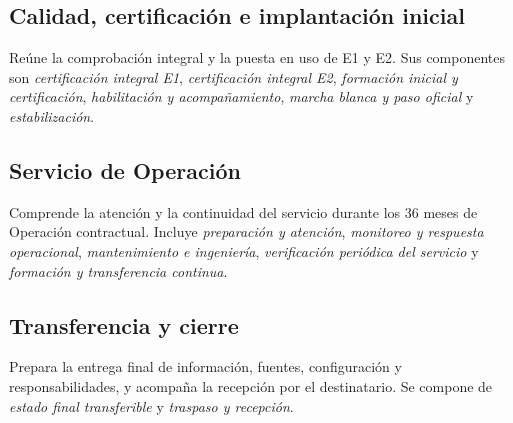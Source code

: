\subsection{Calidad, certificación e implantación inicial}
Reúne la comprobación integral y la puesta en uso de E1 y E2. Sus componentes
son \emph{certificación integral E1}, \emph{certificación integral E2},
\emph{formación inicial y certificación}, \emph{habilitación y acompañamiento},
\emph{marcha blanca y paso oficial} y \emph{estabilización}.

\subsection{Servicio de Operación}
Comprende la atención y la continuidad del servicio durante los 36 meses de
Operación contractual. Incluye \emph{preparación y atención}, \emph{monitoreo
y respuesta operacional}, \emph{mantenimiento e ingeniería}, \emph{verificación
periódica del servicio} y \emph{formación y transferencia continua}.

\subsection{Transferencia y cierre}
Prepara la entrega final de información, fuentes, configuración y
responsabilidades, y acompaña la recepción por el destinatario. Se compone de
\emph{estado final transferible} y \emph{traspaso y recepción}.

